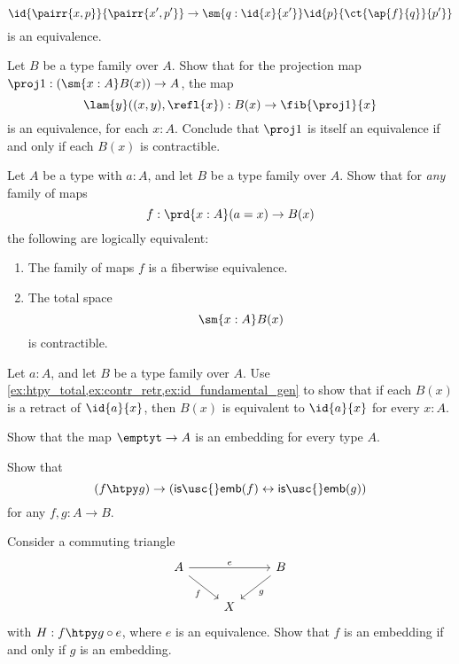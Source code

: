 \begin{exercises}
\begin{equation*}
\id{\pairr{x,p}}{\pairr{x',p'}}\to \sm{q:\id{x}{x'}} \id{p}{\ct{\ap{f}{q}}{p'}}
\end{equation*}
is an equivalence. 
\item \label{ex:proj_fiber}Let $B$ be a type family over $A$. Show that for the projection map
$\proj 1 : (\sm{x:A}B(x))\to A$, the map
\begin{equation*}
\lam{y}((x,y),\refl{x}) : B(x)\to \fib{\proj 1}{x}
\end{equation*}
is an equivalence, for each $x:A$. Conclude that $\proj 1$ is itself an equivalence if and only if each $B(x)$ is contractible.
\item \label{ex:id_fundamental_gen}Let $A$ be a type with $a:A$, and let $B$ be a type family over $A$. Show that for \emph{any} family of maps
\begin{equation*}
f:\prd{x:A} (a=x)\to B(x)
\end{equation*}
the following are logically equivalent:
\begin{enumerate}
\item The family of maps $f$ is a fiberwise equivalence.
\item The total space
\begin{equation*}
\sm{x:A}B(x)
\end{equation*}
is contractible.
\end{enumerate}
\item \label{ex:id_fundamental_retr}Let $a:A$, and let $B$ be a type family over $A$. Use \autoref{ex:htpy_total,ex:contr_retr,ex:id_fundamental_gen} to show that if each $B(x)$ is a retract of $\id{a}{x}$, then $B(x)$ is equivalent to $\id{a}{x}$ for every $x:A$.
\item Show that the map $\emptyt\to A$ is an embedding for every type $A$.
\item Show that 
\begin{equation*}
(f\htpy g)\to (\mathsf{is\usc{}emb}(f)\leftrightarrow\mathsf{is\usc{}emb}(g))
\end{equation*}
for any $f,g:A\to B$.
\item \label{ex:emb_triangle}Consider a commuting triangle
\begin{equation*}
\begin{tikzcd}
A \arrow[rr,"e"] \arrow[dr,swap,"f"] & & B \arrow[dl,"g"] \\
& X
\end{tikzcd}
\end{equation*}
with $H:f\htpy g\circ e$, where $e$ is an equivalence. Show that $f$ is an embedding if and only if $g$ is an embedding.

\end{exercises}
